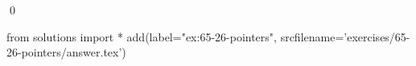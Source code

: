 
\begin{ex}
  \label{ex:65-26-pointers}
  
  \qed
\end{ex}
\begin{python0}
from solutions import *
add(label="ex:65-26-pointers",
    srcfilename='exercises/65-26-pointers/answer.tex')
\end{python0}
